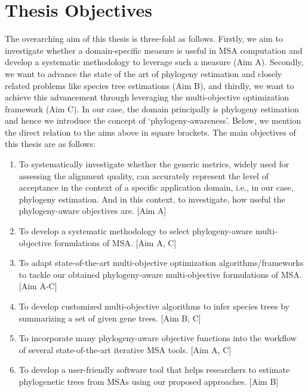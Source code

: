 \section{Thesis Objectives}
The overarching aim of this thesis is three-fold as follows. Firstly, we aim to investigate whether a domain-specific measure is useful in MSA computation and develop a systematic methodology to leverage such a measure (Aim A). Secondly, we want to advance the state of the art of phylogeny estimation and closely related problems like species tree estimations (Aim B), and thirdly, we want to achieve this advancement through leveraging the multi-objective optimization framework (Aim C). In our case, the domain principally is phylogeny estimation and hence we introduce the concept of ‘phylogeny-awareness’. Below, we mention the direct relation to the aims above in square brackets. The main objectives of this thesis are as follows:

\begin{enumerate}
\item To systematically investigate whether the generic metrics, widely used for assessing the alignment quality, can accurately represent the level of acceptance in the context of a specific application domain, i.e., in our case, phylogeny estimation. And in this context, to investigate, how useful the phylogeny-aware objectives are. [Aim A]

\item To develop a systematic methodology to select phylogeny-aware multi-objective formulations of MSA. [Aim A, C]

\item To adapt state-of-the-art multi-objective optimization algorithms/frameworks to tackle our obtained phylogeny-aware multi-objective formulations of MSA. [Aim A-C]

\item To develop customized multi-objective algorithms to infer species trees by summarizing a set of given gene trees. [Aim B, C]

\item To incorporate many phylogeny-aware objective functions into the workflow of several state-of-the-art iterative MSA tools. [Aim A, C]

\item To develop a user-friendly software tool that helps researchers to estimate phylogenetic trees from MSAs using our proposed approaches. [Aim B]
\end{enumerate}

